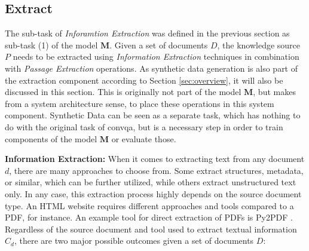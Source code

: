 



\subsection{Extract}
\label{subsec:extract}

The sub-task of \textit{Inforamtion Extraction} was defined in the previous section as sub-task (1) of the model $\mathbf{M}$. Given a set of documents $D$, the knowledge source $P$ needs to be extracted using \textit{Information Extraction} techniques in combination with \textit{Passage Extraction} operations. As synthetic data generation is also part of the extraction component according to Section \ref{sec:overview}, it will also be discussed in this section. This is originally not part of the model $\mathbf{M}$, but makes from a system architecture sense, to place these operations in this system component. Synthetic Data can be seen as a separate task, which has nothing to do with the original task of \gls{convqa}, but is a necessary step in order to train components of the model $\mathbf{M}$ or evaluate those.

\vspace{\baselineskip} %

\textbf{Information Extraction:} When it comes to extracting text from any document $d$, there are many approaches to choose from. Some extract structures, metadata, or similar, which can be further utilized, while others extract unstructured text only. In any case, this extraction process highly depends on the source document type. An HTML website requires different approaches and tools compared to a PDF, for instance. An example tool for direct extraction of PDFs is Py2PDF \cite{noauthor_welcome_nodate}. Regardless of the source document and tool used to extract textual information $C_d$, there are two major possible outcomes given a set of documents $D$:

